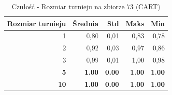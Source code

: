 \begin{table}[htbp]
\centering
\small
\setlength{\tabcolsep}{6pt}
\renewcommand{\arraystretch}{1.2}
\caption{Czułość - Rozmiar turnieju na zbiorze 73 (CART)}
\label{tab:CART_tournament_size_73_recall}
\begin{tabular}{r|r|r|r|r}
\toprule
Rozmiar turnieju & Średnia & Std & Maks & Min \\
\hline
1 & 0,80 & 0,01 & 0,83 & 0,78 \\
2 & 0,92 & 0,03 & 0,97 & 0,86 \\
3 & 0,99 & 0,01 & 1,00 & 0,98 \\
\textbf{5} & \textbf{1.00} & \textbf{0.00} & \textbf{1.00} & \textbf{1.00} \\
\textbf{10} & \textbf{1.00} & \textbf{0.00} & \textbf{1.00} & \textbf{1.00} \\
\bottomrule
\end{tabular}
\end{table}